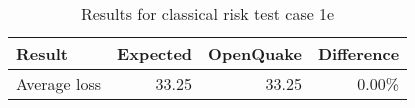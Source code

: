 \begin{table}[htbp]

\centering
\begin{tabular}{ l r r r }

\hline
\rowcolor{anti-flashwhite}
\bf{Result} & \bf{Expected} & \bf{OpenQuake} & \bf{Difference}\\
\hline
Average loss & 33.25 & 33.25 & 0.00\% \\
\hline
\end{tabular}

\caption{Results for classical risk test case 1e}
\label{tab:result-cr-1e}
\end{table}